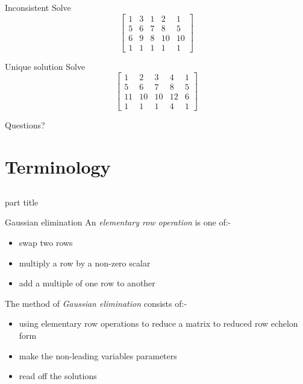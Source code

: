 \documentclass{beamer}
\begin{document}
\begin{frame}{Inconsistent}
  Solve
  \begin{equation*}
      \left[
        \begin{array}{rrrr|r}
          1 & 3 & 1 & 2 & 1 \\
          5 & 6 & 7 & 8 & 5 \\
          6 & 9 & 8 & 10 & 10 \\
          1 & 1 & 1 & 1 & 1
        \end{array}
      \right] 
    \end{equation*}
\end{frame}

\begin{frame}{Unique solution}
  Solve
  \begin{equation*}
      \left[
        \begin{array}{rrrr|r}
          1 & 2 & 3 & 4 & 1 \\
          5 & 6 & 7 & 8 & 5 \\
          11 & 10 & 10 & 12 & 6 \\
          1 & 1 & 1 & 4 & 1
        \end{array}
      \right] 
    \end{equation*}
\end{frame}

\begin{frame}
  Questions?
\end{frame}

\section{Terminology}
\subsection{}
\begin{frame}
    \begin{beamercolorbox}[sep=12pt,center]{part title}
      \insertsection\par
    \end{beamercolorbox}
\end{frame}

\begin{frame}{Gaussian elimination}
  An \emph{elementary row operation} is one of:-
  \begin{itemize}
  \item swap two rows
  \item multiply a row by a non-zero scalar
  \item add a multiple of one row to another
  \end{itemize}\vfill
  The method of \emph{Gaussian elimination} consists of:-
  \begin{itemize}
  \item using elementary row operations to reduce a matrix to reduced row echelon form
  \item make the non-leading variables parameters
  \item read off the solutions
  \end{itemize}
\end{frame}
\end{document}
